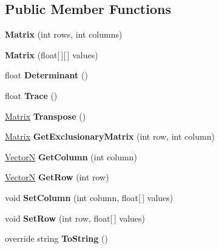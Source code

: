 \subsection*{Public Member Functions}
\begin{DoxyCompactItemize}
\item 
\mbox{\label{class_pillar3_d_1_1_matrix_a64beebf9fcf02359cef7c67192b9ed2a}} 
{\bfseries Matrix} (int rows, int columns)
\item 
\mbox{\label{class_pillar3_d_1_1_matrix_ab235003e1b5247725d21d31d78b36d8f}} 
{\bfseries Matrix} (float\mbox{[}$\,$\mbox{]}\mbox{[}$\,$\mbox{]} values)
\item 
\mbox{\label{class_pillar3_d_1_1_matrix_aef7d44611db4397544f49ca8033cfee0}} 
float {\bfseries Determinant} ()
\item 
\mbox{\label{class_pillar3_d_1_1_matrix_a4dfa66ec81485f719f0d27056cd73a46}} 
float {\bfseries Trace} ()
\item 
\mbox{\label{class_pillar3_d_1_1_matrix_a65c68040c1e23a49cf9d9e3372357ec4}} 
\hyperlink{class_pillar3_d_1_1_matrix}{Matrix} {\bfseries Transpose} ()
\item 
\mbox{\label{class_pillar3_d_1_1_matrix_a7ffcc88bea24885317f5fdb7da79607f}} 
\hyperlink{class_pillar3_d_1_1_matrix}{Matrix} {\bfseries Get\+Exclusionary\+Matrix} (int row, int column)
\item 
\mbox{\label{class_pillar3_d_1_1_matrix_a935dcbdbfb9c78de7edecee966009926}} 
\hyperlink{class_pillar3_d_1_1_vector_n}{VectorN} {\bfseries Get\+Column} (int column)
\item 
\mbox{\label{class_pillar3_d_1_1_matrix_a8a18678e237023687dd21994d57d144b}} 
\hyperlink{class_pillar3_d_1_1_vector_n}{VectorN} {\bfseries Get\+Row} (int row)
\item 
\mbox{\label{class_pillar3_d_1_1_matrix_a0e63faade77870cb72dc470d70c3fb73}} 
void {\bfseries Set\+Column} (int column, float\mbox{[}$\,$\mbox{]} values)
\item 
\mbox{\label{class_pillar3_d_1_1_matrix_af02cd4b7c8b711136ee3a707b77cf84e}} 
void {\bfseries Set\+Row} (int row, float\mbox{[}$\,$\mbox{]} values)
\item 
\mbox{\label{class_pillar3_d_1_1_matrix_a0052f6e33677639477622eaf435602ba}} 
override string {\bfseries To\+String} ()
\end{DoxyCompactItemize}
